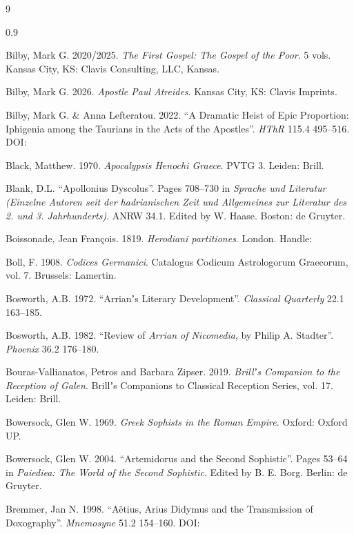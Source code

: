 \begin{thebibliography}{9}
\begin{spacing}{0.9}
\begin{small}
Bilby, Mark G. 2020/2025. %
\textit{The First Gospel: The Gospel of the Poor}. 5 vols. %
Kansas City, KS: Clavis Consulting, LLC, Kansas. %

Bilby, Mark G. 2026. %
\textit{Apostle Paul Atreides}. %
Kansas City, KS: Clavis Imprints. %

Bilby, Mark G. \& Anna Lefteratou. 2022. %
“A Dramatic Heist of Epic Proportion: Iphigenia among the Taurians in the Acts of the Apostles”. %
\textit{HThR} 115.4 495--516. %
DOI: 

Black, Matthew. 1970. %
\textit{Apocalypsis Henochi Graece}. %
PVTG 3. Leiden: Brill. %

Blank, D.L. “Apollonius Dyscolus”. %
Pages 708--730 in \textit{Sprache und Literatur (Einzelne Autoren seit der hadrianischen Zeit %
und Allgemeines zur Literatur des 2. und 3. Jahrhunderts)}. %
ANRW 34.1. Edited by W. Haase. %
Boston: de Gruyter. %

Boissonade, Jean François. 1819. %
\textit{Herodiani partitiones}. %
London. %
Handle: 

Boll, F. 1908. %
\textit{Codices Germanici}. %
Catalogus Codicum Astrologorum Graecorum, vol. 7. %
Brussels: Lamertin. %

Bosworth, A.B. 1972. %
“Arrianʼs Literary Development”. %
\textit{Classical Quarterly} 22.1 163--185. %

Bosworth, A.B. 1982. %
“Review of \textit{Arrian of Nicomedia}, by Philip A. Stadter”. %
\textit{Phoenix} 36.2 176--180. %

Bouras-Vallianatos, Petros and Barbara Zipser. 2019. %
\textit{Brillʼs Companion to the Reception of Galen}. %
Brillʼs Companions to Classical Reception Series, vol. 17. %
Leiden: Brill. %

Bowersock, Glen W. 1969. %
\textit{Greek Sophists in the Roman Empire}. %
Oxford: Oxford UP. %

Bowersock, Glen W. 2004. %
“Artemidorus and the Second Sophistic”. %
Pages 53--64 in \textit{Paiediea: The World of the Second Sophistic}. %
Edited by B. E. Borg. Berlin: de Gruyter. %

Bremmer, Jan N. 1998. %
“Aëtius, Arius Didymus and the Transmission of Doxography”. %
\textit{Mnemosyne} 51.2 154--160. %
DOI: 


\end{small}
\end{spacing}
\end{thebibliography}
